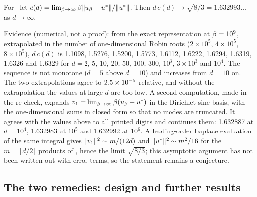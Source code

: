 \begin{conjecture}\label{s6_highdim:conj:dc}
For \Pone\ let $c(d)=\lim_{\beta\to\infty}\beta\lVert u_{\beta}-u^{*}\rVert/\lVert u^{*}\rVert$. Then
$d\,c(d)\to\sqrt{8/3}=1.632993\ldots$ as $d\to\infty$.
\end{conjecture}
\noindent Evidence (numerical, not a proof): from the exact representation at $\beta=10^9$,
extrapolated in the number of one-dimensional Robin roots ($2\times10^5$, $4\times10^5$,
$8\times10^5$), $d\,c(d)$ is 1.1098, 1.5276, 1.5200, 1.5773, 1.6112, 1.6222, 1.6294, 1.6319, 1.6326
and 1.6329 for $d=2$, 5, 10, 20, 50, 100, 300, $10^3$, $3\times10^3$ and $10^4$. The sequence is
not monotone ($d=5$ above $d=10$) and increases from $d=10$ on. The two extrapolations agree to
$2.5\times 10^{-5}$ relative, and without the extrapolation the values at large $d$ are too low.
A second computation, made in the re-check, expands $v_1=\lim_{\beta\to\infty}\beta(u_{\beta}-u^{*})$ in
the Dirichlet sine basis, with the one-dimensional sums in closed form so that no modes are
truncated. It agrees with the values above to all printed digits and continues them: 1.632887 at
$d=10^4$, 1.632983 at $10^5$ and 1.632992 at $10^6$. A leading-order Laplace evaluation of the same
integral gives $\lVert v_1\rVert^2\sim m/(12d)$ and $\lVert u^{*}\rVert^2\sim m^2/16$ for the $m=\lfloor
d/2\rfloor$ products of \Pone, hence the limit $\sqrt{8/3}$; this asymptotic argument has not been
written out with error terms, so the statement remains a conjecture.

\subsection{The two remedies: design and further results}\label{S5:sec:remedies}


